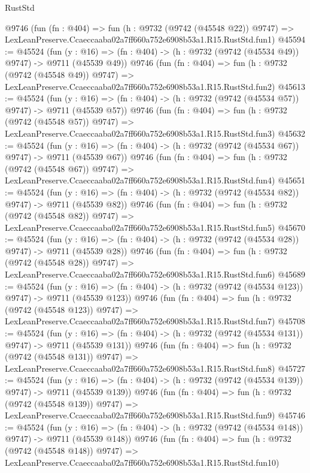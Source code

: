 \begin{lexlean}{RustStd}
\begin{coremodule}
    @9746
    (fun (fn : @404) =>
    fun (h : @9732 (@9742 (@45548 @22)) @9747) =>
    LexLeanPreserve.Ccaeccaaba02a7ff660a752e6908b53a1.R15.RustStd.fun1)
@45594 := @45524
    (fun (y : @16) => (fn : @404) -> (h : @9732 (@9742 (@45534 @49)) @9747) -> @9711 (@45539 @49))
    @9746
    (fun (fn : @404) =>
    fun (h : @9732 (@9742 (@45548 @49)) @9747) =>
    LexLeanPreserve.Ccaeccaaba02a7ff660a752e6908b53a1.R15.RustStd.fun2)
@45613 := @45524
    (fun (y : @16) => (fn : @404) -> (h : @9732 (@9742 (@45534 @57)) @9747) -> @9711 (@45539 @57))
    @9746
    (fun (fn : @404) =>
    fun (h : @9732 (@9742 (@45548 @57)) @9747) =>
    LexLeanPreserve.Ccaeccaaba02a7ff660a752e6908b53a1.R15.RustStd.fun3)
@45632 := @45524
    (fun (y : @16) => (fn : @404) -> (h : @9732 (@9742 (@45534 @67)) @9747) -> @9711 (@45539 @67))
    @9746
    (fun (fn : @404) =>
    fun (h : @9732 (@9742 (@45548 @67)) @9747) =>
    LexLeanPreserve.Ccaeccaaba02a7ff660a752e6908b53a1.R15.RustStd.fun4)
@45651 := @45524
    (fun (y : @16) => (fn : @404) -> (h : @9732 (@9742 (@45534 @82)) @9747) -> @9711 (@45539 @82))
    @9746
    (fun (fn : @404) =>
    fun (h : @9732 (@9742 (@45548 @82)) @9747) =>
    LexLeanPreserve.Ccaeccaaba02a7ff660a752e6908b53a1.R15.RustStd.fun5)
@45670 := @45524
    (fun (y : @16) => (fn : @404) -> (h : @9732 (@9742 (@45534 @28)) @9747) -> @9711 (@45539 @28))
    @9746
    (fun (fn : @404) =>
    fun (h : @9732 (@9742 (@45548 @28)) @9747) =>
    LexLeanPreserve.Ccaeccaaba02a7ff660a752e6908b53a1.R15.RustStd.fun6)
@45689 := @45524
    (fun (y : @16) => (fn : @404) -> (h : @9732 (@9742 (@45534 @123)) @9747) -> @9711 (@45539 @123))
    @9746
    (fun (fn : @404) =>
    fun (h : @9732 (@9742 (@45548 @123)) @9747) =>
    LexLeanPreserve.Ccaeccaaba02a7ff660a752e6908b53a1.R15.RustStd.fun7)
@45708 := @45524
    (fun (y : @16) => (fn : @404) -> (h : @9732 (@9742 (@45534 @131)) @9747) -> @9711 (@45539 @131))
    @9746
    (fun (fn : @404) =>
    fun (h : @9732 (@9742 (@45548 @131)) @9747) =>
    LexLeanPreserve.Ccaeccaaba02a7ff660a752e6908b53a1.R15.RustStd.fun8)
@45727 := @45524
    (fun (y : @16) => (fn : @404) -> (h : @9732 (@9742 (@45534 @139)) @9747) -> @9711 (@45539 @139))
    @9746
    (fun (fn : @404) =>
    fun (h : @9732 (@9742 (@45548 @139)) @9747) =>
    LexLeanPreserve.Ccaeccaaba02a7ff660a752e6908b53a1.R15.RustStd.fun9)
@45746 := @45524
    (fun (y : @16) => (fn : @404) -> (h : @9732 (@9742 (@45534 @148)) @9747) -> @9711 (@45539 @148))
    @9746
    (fun (fn : @404) =>
    fun (h : @9732 (@9742 (@45548 @148)) @9747) =>
    LexLeanPreserve.Ccaeccaaba02a7ff660a752e6908b53a1.R15.RustStd.fun10)

\end{coremodule}
\end{lexlean}
